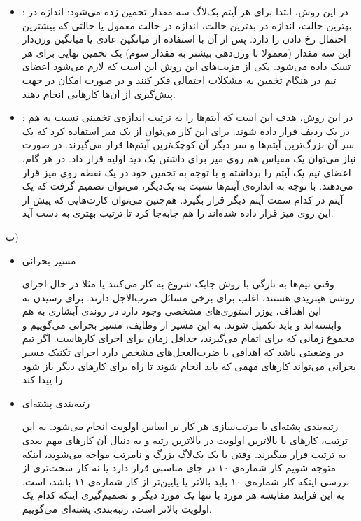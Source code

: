 {\begin{itemize}
\item
{}:
در این روش، ابتدا برای هر آیتم بک‌لاگ سه مقدار تخمین زده می‌شود: اندازه در بهترین‌ حالت، اندازه در بدترین حالت، اندازه در حالت معمول یا حالتی که بیشترین احتمال رخ دادن را دارد. پس از آن با استفاده از میانگین عادی یا میانگین وزن‌دار این سه مقدار (معمولا با وزن‌دهی بیشتر به مقدار سوم) یک تخمین نهایی برای هر تسک داده می‌شود. یکی از مزیت‌های این روش این است که لازم می‌شود اعضای تیم در هنگام تخمین به مشکلات احتمالی فکر کنند و در صورت امکان در جهت پیش‌گیری از آن‌ها کارهایی انجام دهند.

\item
{}:
در این روش، هدف این است که آیتم‌ها را به ترتیب اندازه‌ی تخمینی نسبت به هم در یک ردیف قرار داده شوند. برای این کار می‌توان از یک میز استفاده کرد که یک سر آن بزرگ‌ترین آیتم‌ها‌ و سر دیگر آن کوچک‌ترین آیتم‌ها قرار می‌گیرند. در صورت نیاز می‌توان یک مقیاس هم روی میز برای داشتن یک دید اولیه قرار داد. در هر گام، اعضای تیم یک آیتم را برداشته و با توجه به تخمین خود در یک نقطه روی میز قرار می‌دهند. با توجه به اندازه‌ی آیتم‌ها نسبت به یک‌دیگر، می‌توان تصمیم گرفت که یک آیتم در کدام سمت آیتم دیگر قرار بگیرد. هم‌چنین می‌توان کارت‌هایی که پیش از این روی میز قرار داده شده‌اند را هم جابه‌جا کرد تا ترتیب بهتری به دست آید.


\end{itemize}


ب)
\begin{itemize}
    \item مسیر بحرانی

    وقتی تیم‌ها به تازگی با روش جابک شروع به کار می‌کنند یا مثلا در حال اجرای روشی هیبریدی هستند، اغلب برای برخی مسائل ضرب‌الاجل دارند. برای رسیدن به این اهداف، یوزر استوری‌های مشخصی وجود دارد در روندی آبشاری به هم وابسته‌اند و باید تکمیل شوند. به این مسیر از وظایف، مسیر بحرانی می‌گوییم و مجموع زمانی که برای اتمام می‌گیرند، حداقل زمان برای اجرای کارهاست. اگر تیم در وضعیتی باشد که اهدافی با ضرب‌العجل‌های مشخص دارد اجرای تکنیک مسیر بحرانی می‌تواند کارهای مهمی که باید انجام شوند تا راه برای کار‌های دیگر باز شود را پیدا کند.
    \item رتبه‌بندی پشته‌ای

    رتبه‌بندی پشته‌ای با مرتب‌سازی هر کار بر اساس اولویت انجام می‌شود. به این ترتیب، کارهای با بالاترین اولویت در بالاترین رتبه و به دنبال آن کارهای مهم بعدی به ترتیب قرار میگیرند. وقتی با یک بک‌لاگ بزرگ و نامرتب مواجه می‌شوید، اینکه متوجه شویم کار شماره‌ی ۱۰ در جای مناسبی قرار دارد یا نه کار سخت‌تری از بررسی اینکه کار شماره‌ی ۱۰ باید بالاتر یا پایین‌تر از کار شماره‌ی ۱۱ باشد، است. به این فرایند مقایسه هر مورد با تنها یک مورد دیگر و تصمیم‌گیری اینکه کدام یک اولویت بالاتر است، رتبه‌بندی پشته‌ای می‌گوییم.


\end{itemize}}
